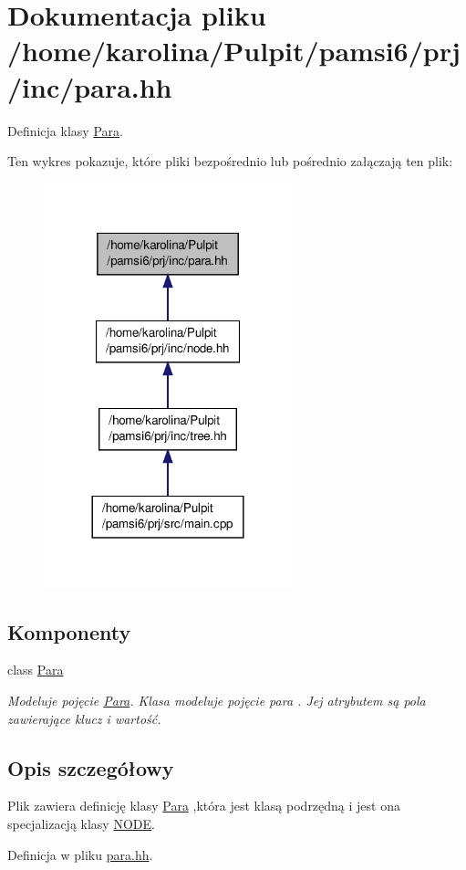 \hypertarget{para_8hh}{\section{Dokumentacja pliku /home/karolina/\-Pulpit/pamsi6/prj/inc/para.hh}
\label{para_8hh}
}


Definicja klasy \hyperlink{class_para}{Para}.  


Ten wykres pokazuje, które pliki bezpośrednio lub pośrednio załączają ten plik\-:\nopagebreak
\begin{figure}[H]
\begin{center}
\leavevmode
\includegraphics[width=204pt]{para_8hh__dep__incl}
\end{center}
\end{figure}
\subsection*{Komponenty}
\begin{DoxyCompactItemize}
\item 
class \hyperlink{class_para}{Para}
\begin{DoxyCompactList}\small\item\em Modeluje pojęcie \hyperlink{class_para}{Para}. Klasa modeluje pojęcie para . Jej atrybutem są pola zawierające klucz i wartość. \end{DoxyCompactList}\end{DoxyCompactItemize}


\subsection{Opis szczegółowy}
Plik zawiera definicję klasy \hyperlink{class_para}{Para} ,która jest klasą podrzędną i jest ona specjalizacją klasy \hyperlink{class_n_o_d_e}{N\-O\-D\-E}. 

Definicja w pliku \hyperlink{para_8hh_source}{para.\-hh}.

